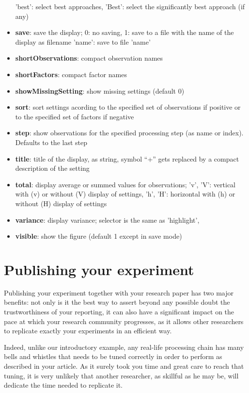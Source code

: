 \documentclass[a4paper,fleqn]{tufte-handout}
\begin{document}
\begin{itemize}
        'best': select best approaches,
        'Best': select the significantly best approach (if any)                 
\item \textbf{save}: save the display;
    	0: no saving,
    	1: save to a file with the name of the display as filename
    	'name': save to file 'name'
\item \textbf{shortObservations}: compact observation names                 
\item \textbf{shortFactors}: compact factor names  
\item \textbf{showMissingSetting}:  show missing settings (default 0)                
\item \textbf{sort}:   sort settings acording to the specified set of observations if
        positive or to the specified set of factors if negative
\item \textbf{step}: show observations for the specified processing step (as name or
    index). Defaults to the last step
\item \textbf{title}: title of the display, as string,
    	symbol ``+'' gets replaced by a compact description of the setting  
\item \textbf{total}:  display average  or summed values for observations;
        'v', 'V': vertical with (v) or without (V) display of settings,
        'h', 'H': horizontal with (h) or without (H) display of settings                
\item \textbf{variance}:   display variance;
    	selector is the same as 'highlight',
\item \textbf{visible}: show the figure (default 1 except in save mode)                    
\end{itemize}

\section{Publishing your experiment}
\hypertarget{publish}{}
 
Publishing your experiment together with your research paper has two major benefits: not only is it the best way to assert beyond any possible doubt the trustworthiness of your reporting, it can also have a significant impact on the pace at which your research community progresses, as it allows other researchers to replicate exactly your experiments in an efficient way.

Indeed, unlike our introductory example, any real-life processing chain has many bells and whistles that needs to be tuned correctly in order to perform as described in your article. As it surely took you time and great care to reach that tuning, it is very unlikely that another researcher, as skillful as he may be, will dedicate the time needed to replicate it.
\end{document}
